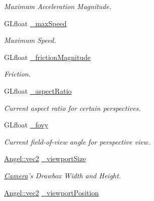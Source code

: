 \begin{DoxyCompactItemize}
\begin{DoxyCompactList}\small\item\em Maximum Acceleration Magnitude. \end{DoxyCompactList}\item 
\hypertarget{class_camera_a83cab43f9ccc3d5f4c7db8543a806745}{G\-Lfloat \hyperlink{class_camera_a83cab43f9ccc3d5f4c7db8543a806745}{\-\_\-max\-Speed}}\label{class_camera_a83cab43f9ccc3d5f4c7db8543a806745}

\begin{DoxyCompactList}\small\item\em Maximum Speed. \end{DoxyCompactList}\item 
G\-Lfloat \hyperlink{class_camera_a66fb66da0ccd400c4986dc19276b6716}{\-\_\-friction\-Magnitude}
\begin{DoxyCompactList}\small\item\em Friction. \end{DoxyCompactList}\item 
G\-Lfloat \hyperlink{class_camera_a42082e8f2d80a13674ce163d8e720bfb}{\-\_\-aspect\-Ratio}
\begin{DoxyCompactList}\small\item\em Current aspect ratio for certain perspectives. \end{DoxyCompactList}\item 
G\-Lfloat \hyperlink{class_camera_a82542bb76347e2a2bb66b3bb7842945b}{\-\_\-fovy}
\begin{DoxyCompactList}\small\item\em Current field-\/of-\/view angle for perspective view. \end{DoxyCompactList}\item 
\hypertarget{class_camera_a67c7600162abef1d2cddfce8cc75c33b}{\hyperlink{struct_angel_1_1vec2}{Angel\-::vec2} \hyperlink{class_camera_a67c7600162abef1d2cddfce8cc75c33b}{\-\_\-viewport\-Size}}\label{class_camera_a67c7600162abef1d2cddfce8cc75c33b}

\begin{DoxyCompactList}\small\item\em \hyperlink{class_camera}{Camera}'s Drawbox Width and Height. \end{DoxyCompactList}\item 
\hypertarget{class_camera_adb7506be3632abc2d33e77a5783f5be8}{\hyperlink{struct_angel_1_1vec2}{Angel\-::vec2} \hyperlink{class_camera_adb7506be3632abc2d33e77a5783f5be8}{\-\_\-viewport\-Position}}\label{class_camera_adb7506be3632abc2d33e77a5783f5be8}


\end{DoxyCompactItemize}
